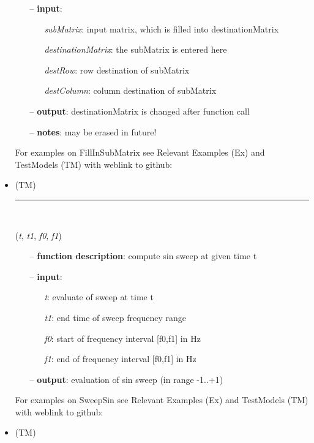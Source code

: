 \begin{itemize}[leftmargin=1.4cm]
\begin{itemize}[leftmargin=0.7cm]
\item[--]
{\bf input}: \vspace{-6pt}
\begin{itemize}[leftmargin=1.2cm]
\setlength{\itemindent}{-0.7cm}
\item[]{\it subMatrix}: input matrix, which is filled into destinationMatrix
\item[]{\it destinationMatrix}: the subMatrix is entered here
\item[]{\it destRow}: row destination of subMatrix
\item[]{\it destColumn}: column destination of subMatrix
\end{itemize}
\item[--]
{\bf output}: destinationMatrix is changed after function call
\item[--]
{\bf notes}: may be erased in future!
\vspace{12pt}\end{itemize}
%
%
\noindent For examples on FillInSubMatrix see Relevant Examples (Ex) and TestModels (TM) with weblink to github:
\bi
 \item \footnotesize {} (TM)
\ei

%
\noindent\rule{8cm}{0.75pt}\vspace{1pt} \\ 
\begin{flushleft}
\label{sec:advancedUtilities:SweepSin}
({\it t}, {\it t1}, {\it f0}, {\it f1})
\end{flushleft}
\setlength{\itemindent}{0.7cm}
\begin{itemize}[leftmargin=0.7cm]
\item[--]
{\bf function description}: compute sin sweep at given time t
\item[--]
{\bf input}: \vspace{-6pt}
\begin{itemize}[leftmargin=1.2cm]
\setlength{\itemindent}{-0.7cm}
\item[]{\it t}: evaluate of sweep at time t
\item[]{\it t1}: end time of sweep frequency range
\item[]{\it f0}: start of frequency interval [f0,f1] in Hz
\item[]{\it f1}: end of frequency interval [f0,f1] in Hz
\end{itemize}
\item[--]
{\bf output}: evaluation of sin sweep (in range -1..+1)
\vspace{12pt}\end{itemize}
%
%
\noindent For examples on SweepSin see Relevant Examples (Ex) and TestModels (TM) with weblink to github:
\bi
 \item \footnotesize {} (TM)
\ei


\end{itemize}
